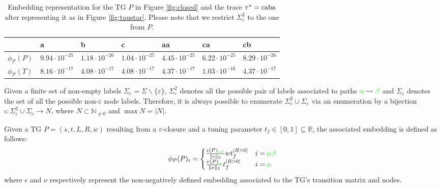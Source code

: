 \begin{table}[!t]
	\centering
	\caption{Embedding representation for the TG $P$ in Figure \ref{fig:closed} and the trace $\tau^*=\textup{caba}$ after representing it as in Figure \ref{fig:taustar}. Please note that we restrict $\Sigma_\varepsilon^2$ to the one from $P$.}\label{tab:emb1}
		\begin{tabular}{l|l|l|l|l|l|l|}
	\toprule
	& a    & b                                                   & c    & aa   & ca   & cb   \\
	\midrule
	$\phi_{\mathcal{P}}(P)$ & $9.94\cdot10^{-25}$ & $1.18\cdot 10^{-26}$ & $1.04\cdot10^{-25}$ & $4.45\cdot 10^{-25}$ & $6.22\cdot10^{-25}$ & $8.29\cdot10^{-26}$\\
	$\phi_{\mathcal{P}}(T)$ & $8.16\cdot10^{-17}$ & $4.08\cdot 10^{-17}$ & $4.08\cdot10^{-17}$ & $4.37\cdot 10^{-17}$ & $1.03\cdot10^{-16}$ & $4.37\cdot10^{-17}$\\
	\bottomrule
\end{tabular}
\end{table}
\begin{definition}[TG Embedding]\label{def:ppne}
Given a finite set of non-empty labels $\Sigma_\varepsilon =\Sigma\backslash\{\varepsilon\}$, $\Sigma_\varepsilon^2$ denotes all the possible pair of labels associated to paths ${\color{green}\alpha}\rightsquigarrow{\color{green}\beta}$ and $\Sigma_\varepsilon$ denotes the set of all the possible non-$\varepsilon$ node labels. Therefore, it is always possible to enumerate $\Sigma_\varepsilon^2\cup\Sigma_\varepsilon$ via an enumeration by a bijection $\iota\colon \Sigma_\varepsilon^2\cup\Sigma_\varepsilon\to  N$, where $N\subset \mathbb{N}_{\neq 0}$ and $\max N=|N|$.
	
Given a TG $P=(s,t,L,R,w)$ resulting from a $\varepsilon$-closure and a tuning parameter $t_f\in[0,1]\subseteq\mathbb{R}$, the associated embedding is defined as follows:
$$\phi_{\mathcal{P}}(P)_i=\begin{cases}
	\frac{\epsilon(P)_{\color{green}\alpha\beta}}{\|\epsilon\|_2}wt_f^{|R>0|} & i={\color{green}\alpha\beta}\\
	\frac{\nu(P)_{\color{green}\alpha}}{\|\nu\|_2}t_f^{|R>0|} & i={\color{green}\alpha}\\
\end{cases}$$
where $\epsilon$ and $\nu$ respectively represent the non-negatively defined embedding associated to the TG's transition matrix and nodes. 
\end{definition}

